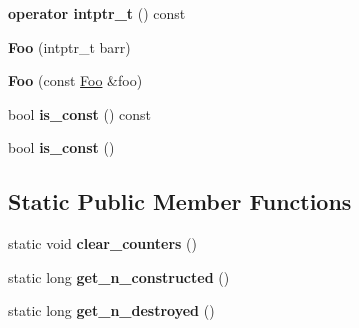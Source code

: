 \begin{DoxyCompactItemize}
\item 
\hypertarget{structFoo_a8688104e13897b5052fc70a41050be71}{}{\bfseries operator intptr\+\_\+t} () const \label{structFoo_a8688104e13897b5052fc70a41050be71}

\item 
\hypertarget{structFoo_a8850cc430f85bfd2d641c8d74d9cb047}{}{\bfseries Foo} (intptr\+\_\+t barr)\label{structFoo_a8850cc430f85bfd2d641c8d74d9cb047}

\item 
\hypertarget{structFoo_aa1c71f4519773fb8357337dfb1a7f73a}{}{\bfseries Foo} (const \hyperlink{structFoo}{Foo} \&foo)\label{structFoo_aa1c71f4519773fb8357337dfb1a7f73a}

\item 
\hypertarget{structFoo_a6188c776a5d2f1f37a72485f948c2491}{}bool {\bfseries is\+\_\+const} () const \label{structFoo_a6188c776a5d2f1f37a72485f948c2491}

\item 
\hypertarget{structFoo_a2c236bbbc4f98ff079f595200e1cf393}{}bool {\bfseries is\+\_\+const} ()\label{structFoo_a2c236bbbc4f98ff079f595200e1cf393}

\end{DoxyCompactItemize}
\subsection*{Static Public Member Functions}
\begin{DoxyCompactItemize}
\item 
\hypertarget{structFoo_a1dc92a8f42c12ca4228337e60474ac6d}{}static void {\bfseries clear\+\_\+counters} ()\label{structFoo_a1dc92a8f42c12ca4228337e60474ac6d}

\item 
\hypertarget{structFoo_aee0d3d3ccf169446342f91e622656770}{}static long {\bfseries get\+\_\+n\+\_\+constructed} ()\label{structFoo_aee0d3d3ccf169446342f91e622656770}

\item 
\hypertarget{structFoo_aef42b4aaaee301df7a2a153d1b263ae0}{}static long {\bfseries get\+\_\+n\+\_\+destroyed} ()\label{structFoo_aef42b4aaaee301df7a2a153d1b263ae0}

\end{DoxyCompactItemize}
